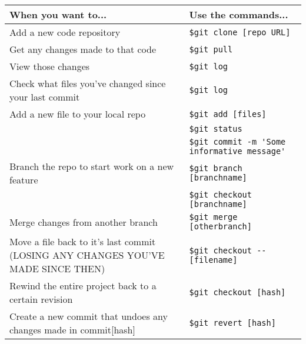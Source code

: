 \documentclass[11pt, a4paper, english]{article}
\begin{document}
\begin{tabular}[c]{|p{}|p{}|}
\hline
\textbf{When you want to...} & \textbf{Use the commands...} \\ \hline
Add a new code repository & \verb|$git clone [repo URL]| \\ \hline
Get any changes made to that code & \verb|$git pull| \\ \hline
View those changes & \verb|$git log| \\ \hline
Check what files you've changed since your last commit & \verb|$git log| \\ \hline
Add a new file to your local repo &
\verb|$git add [files]| \\
&\verb|$git status| \\
&\verb|$git commit -m 'Some informative message'| \\ \hline
Branch the repo to start work on a new feature &
\verb|$git branch [branchname]| \\& \verb|$git checkout [branchname]| \\ \hline
Merge changes from another branch & \verb|$git merge [otherbranch]| \\ \hline
Move a file back to it's last commit (LOSING ANY CHANGES YOU'VE MADE SINCE THEN) & \verb|$git checkout -- [filename]| \\ \hline
Rewind the entire project back to a certain revision & \verb|$git checkout [hash]| \\ \hline
Create a new commit that undoes any changes made in commit[hash] & \verb|$git revert [hash]| \\ \hline

\end{tabular}
\end{document}

